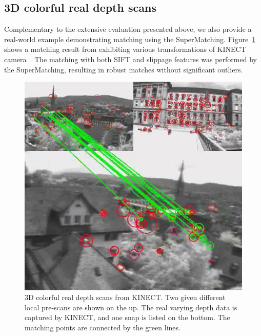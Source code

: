 \subsection{3D colorful real depth scans}
\label{subsec:3dColored}

Complementary to the extensive evaluation presented above, 
we also provide a real-world example demonstrating matching using the SuperMatching. 
Figure~\ref{fig:3DReal} shows a matching result from exhibiting various transformations of KINECT camera~\cite{Kinect12}. 
The matching with both SIFT and slippage features was performed by the SuperMatching,
resulting in robust matches without significant outliers.

\begin{figure}
\centering
  \includegraphics[width=0.98\linewidth]{figures/3DReal.jpg}
  \caption{3D colorful real depth scans from KINECT. 
  Two given different local pre-scans are shown on the up. The real varying depth data is captured by KINECT, and one snap is listed on the bottom. 
  The matching points are connected by the green lines.}
\label{fig:3DReal}
\end{figure}
